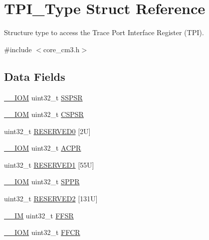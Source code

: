 \hypertarget{struct_t_p_i___type}{}\section{T\+P\+I\+\_\+\+Type Struct Reference}
\label{struct_t_p_i___type}


Structure type to access the Trace Port Interface Register (T\+PI).  




{\ttfamily \#include $<$core\+\_\+cm3.\+h$>$}

\subsection*{Data Fields}
\begin{DoxyCompactItemize}
\item 
\hyperlink{core__sc300_8h_ab6caba5853a60a17e8e04499b52bf691}{\+\_\+\+\_\+\+I\+OM} uint32\+\_\+t \hyperlink{struct_t_p_i___type_a1aa8bba158b6ac122676301f17a362d9}{S\+S\+P\+SR}
\item 
\hyperlink{core__sc300_8h_ab6caba5853a60a17e8e04499b52bf691}{\+\_\+\+\_\+\+I\+OM} uint32\+\_\+t \hyperlink{struct_t_p_i___type_abf4a378b17278d98d2a5f9315fce7a5e}{C\+S\+P\+SR}
\item 
uint32\+\_\+t \hyperlink{struct_t_p_i___type_aa57754b8f88bb376d184aaf6fe74f391}{R\+E\+S\+E\+R\+V\+E\+D0} \mbox{[}2\+U\mbox{]}
\item 
\hyperlink{core__sc300_8h_ab6caba5853a60a17e8e04499b52bf691}{\+\_\+\+\_\+\+I\+OM} uint32\+\_\+t \hyperlink{struct_t_p_i___type_a49a770cf0b7ec970f919f8ac22634fff}{A\+C\+PR}
\item 
uint32\+\_\+t \hyperlink{struct_t_p_i___type_a4d91e8d0f8791a2d137be359e6ca669f}{R\+E\+S\+E\+R\+V\+E\+D1} \mbox{[}55\+U\mbox{]}
\item 
\hyperlink{core__sc300_8h_ab6caba5853a60a17e8e04499b52bf691}{\+\_\+\+\_\+\+I\+OM} uint32\+\_\+t \hyperlink{struct_t_p_i___type_ae9673e1acb75a46ed9852fd7a557cb7d}{S\+P\+PR}
\item 
uint32\+\_\+t \hyperlink{struct_t_p_i___type_ad34dc93fd7d41ef2c3365292cc8a178d}{R\+E\+S\+E\+R\+V\+E\+D2} \mbox{[}131\+U\mbox{]}
\item 
\hyperlink{core__sc300_8h_a4cc1649793116d7c2d8afce7a4ffce43}{\+\_\+\+\_\+\+IM} uint32\+\_\+t \hyperlink{struct_t_p_i___type_a2a049b49e9da6772d38166397ce8fc70}{F\+F\+SR}
\item 
\hyperlink{core__sc300_8h_ab6caba5853a60a17e8e04499b52bf691}{\+\_\+\+\_\+\+I\+OM} uint32\+\_\+t \hyperlink{struct_t_p_i___type_afe3ca1410c32188d26be24c4ee9e180c}{F\+F\+CR}

\end{DoxyCompactItemize}
